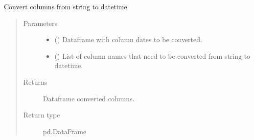 \documentclass[letterpaper,10pt,english]{sphinxmanual}
\begin{document}
\begin{fulllineitems}
\label{\detokenize{source/optimization.datatools:optimization.datatools.dataprep.date_column}}
Convert columns from string to datetime.
\begin{quote}\begin{description}
\item[{Parameters}] \leavevmode\begin{itemize}
\item {} 
 () \textendash{} Dataframe with column dates to be converted.

\item {} 
 () \textendash{} List of column names that need to be converted from string to datetime.

\end{itemize}

\item[{Returns}] \leavevmode
{} \textendash{} Dataframe converted columns.

\item[{Return type}] \leavevmode
pd.DataFrame

\end{description}\end{quote}

\end{fulllineitems}

\end{document}
